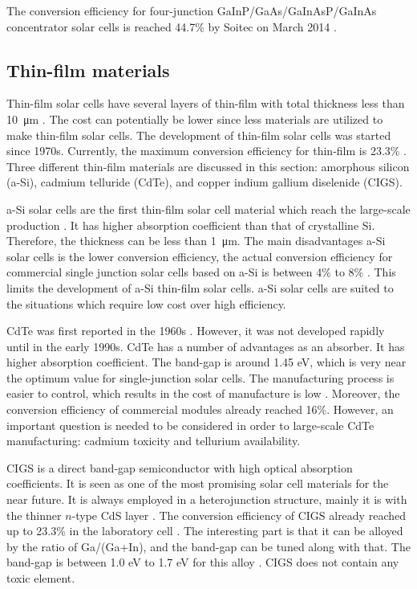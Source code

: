 \documentclass[a4paper, 12pt, titlepage,oneside,drop]{kthesis}
\begin{document}
The conversion efficiency for four-junction GaInP/GaAs/GaInAsP/GaInAs concentrator solar cells is reached 44.7\% by Soitec on March 2014 \cite{dimroth2014wafer}.

\subsection{Thin-film materials}

Thin-film solar cells have several layers of thin-film with total thickness less than \SI{10} {\micro\meter} \cite{maissel1995handbook}. The cost can potentially be lower since less materials are utilized to make thin-film solar cells. The development of thin-film
solar cells was started since 1970s. Currently, the maximum conversion efficiency for thin-film is 23.3\% \cite{ward2014cu}. Three different thin-film
materials are discussed in this section: amorphous silicon (a-Si), cadmium telluride (CdTe), and copper indium gallium diselenide (CIGS).

a-Si solar cells are the first thin-film solar cell material which reach the large-scale production \cite{carlson1976amorphous, street2000technology, schropp1998amorphous}. It has higher absorption coefficient than that of crystalline Si. Therefore, the thickness can be less than \SI{1} {\micro\meter}. The 
main disadvantages a-Si solar cells is the lower conversion efficiency, the actual conversion efficiency for commercial single junction solar cells based on a-Si is between 4\% to 8\% \cite{irena}. This limits the development of a-Si thin-film solar cells.
a-Si solar cells are suited to the situations which require low cost over high efficiency. 

CdTe was first reported in the 1960s \cite{wolden2011photovoltaic}. However, it was not developed rapidly until in the early 1990s. CdTe has a number of advantages as an absorber. It has higher absorption coefficient. The band-gap is around 1.45 eV, which 
is very near the optimum value for single-junction solar cells. The manufacturing process is easier to control, which results in the cost of manufacture is low \cite{meyers1988design}. Moreover, the conversion efficiency of 
commercial modules already reached 16\%.
However, an important question is needed to be considered in order to large-scale CdTe manufacturing: cadmium toxicity and tellurium availability. 

CIGS is a direct band-gap semiconductor with high optical absorption coefficients. It is seen as one of the most promising solar cell materials for the near future. It is always employed in a heterojunction structure, mainly it is with the thinner
$n$-type CdS layer \cite{green2007thin}. The conversion efficiency of CIGS already reached up to 23.3\% in the laboratory cell \cite{jackson2011new}. The interesting part is that it can be alloyed by the ratio of Ga/(Ga+In), and the band-gap can be tuned along with that. The band-gap 
is between 1.0 eV to 1.7 eV for this alloy \cite{kumar2013cation, chen2012band, chen2011parameterization, persson2009impurity, green2006third}. CIGS does not contain any toxic element.
\end{document}
